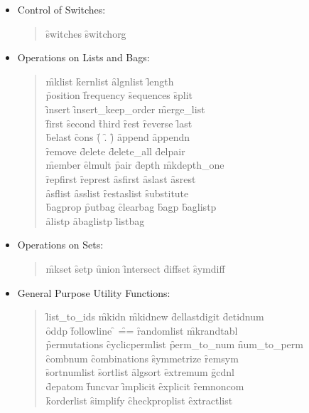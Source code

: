 \begin{itemize}
\item{Control of Switches:}
\begin{quote}
\f{switches} \f{switchorg}
\end{quote}
\item{Operations on Lists and Bags:}
\begin{quote}
\f{mklist} \f{kernlist} \f{algnlist} \f{length} \\
\f{position} \f{frequency} \f{sequences} \f{split} \\
\f{insert} \f{insert\_keep\_order} \f{merge\_list} \\
\f{first} \f{second} \f{third} \f{rest} \f{reverse} \f{last} \\
\f{belast} \f{cons} \f{(} \f{.} \f{)} \f{append} \f{appendn} \\
\f{remove} \f{delete} \f{delete\_all} \f{delpair} \\
\f{member} \f{elmult} \f{pair} \f{depth} \f{mkdepth\_one} \\
\f{repfirst} \f{represt} \f{asfirst} \f{aslast} \f{asrest} \\
\f{asflist} \f{asslist} \f{restaslist} \f{substitute} \\
\f{bagprop} \f{putbag} \f{clearbag} \f{bagp} \f{baglistp} \\
\f{alistp} \f{abaglistp} \f{listbag}
\end{quote}
\item{Operations on Sets:}
\begin{quote}
\f{mkset} \f{setp} \f{union} \f{intersect} \f{diffset} \f{symdiff}
\end{quote}
\item{General Purpose Utility Functions:}
\begin{quote}
\f{list\_to\_ids} \f{mkidn} \f{mkidnew} \f{dellastdigit} \f{detidnum} \\
\f{oddp} \f{followline} \f{} \f{==} \f{randomlist} \f{mkrandtabl} \\
\f{permutations} \f{cyclicpermlist} \f{perm\_to\_num} \f{num\_to\_perm} \\
\f{combnum} \f{combinations} \f{symmetrize} \f{remsym} \\
\f{sortnumlist} \f{sortlist} \f{algsort} \f{extremum} \f{gcdnl} \\
\f{depatom} \f{funcvar} \f{implicit} \f{explicit} \f{remnoncom} \\
\f{korderlist} \f{simplify} \f{checkproplist} \f{extractlist} 
\end{quote}

\end{itemize}
